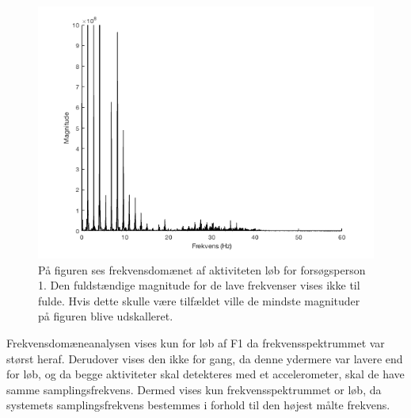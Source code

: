 \begin{figure}[H]
	\centering
	\includegraphics[scale=0.68]{figures/qBilag/fft_f1_loeb}
	\caption{På figuren ses frekvensdomænet af aktiviteten løb for forsøgsperson 1. Den fuldstændige magnitude for de lave frekvenser vises ikke til fulde. Hvis dette skulle være tilfældet ville de mindste magnituder på figuren blive udskalleret.}
	\label{fig:Ap_FFt}
\end{figure}
Frekvensdomæneanalysen vises kun for løb af F1 da frekvensspektrummet var størst heraf. Derudover vises den ikke for gang, da denne ydermere var lavere end for løb, og da begge aktiviteter skal detekteres med et accelerometer, skal de have samme samplingsfrekvens. Dermed vises kun frekvensspektrummet or løb, da systemets samplingsfrekvens bestemmes i forhold til den højest målte frekvens.

